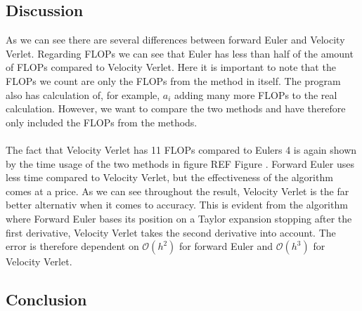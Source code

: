 \documentclass{article}
\newcommand{\husk}[1]{\color{red} #1 \color{black}}
\begin{document}
\subsection{Discussion}
As we can see there are several differences between forward Euler and Velocity Verlet. Regarding FLOPs we can see that Euler has less than half of the amount of FLOPs compared to Velocity Verlet. Here it is important to note that the FLOPs we count are only the FLOPs from the method in itself. The program also has calculation of, for example, $a_i$ adding many more FLOPs to the real calculation. However, we want to compare the two methods and have therefore only included the FLOPs from the methods. \\ \\ The fact that Velocity Verlet has 11 FLOPs compared to Eulers 4 is again shown by the time usage of the two methods in figure \husk{REF Figure}. Forward Euler uses less time compared to Velocity Verlet, but the effectiveness of the algorithm comes at a price. As we can see throughout the result, Velocity Verlet is the far better alternativ when it comes to accuracy. This is evident from the algorithm where Forward Euler bases its position on a Taylor expansion stopping after the first derivative, Velocity Verlet takes the second derivative into account. The error is therefore dependent on $\mathcal{O}(h^2)$ for forward Euler and $\mathcal{O}(h^3)$ for Velocity Verlet.
\subsection{Conclusion}
\end{document}
